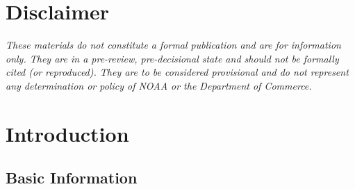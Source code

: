 \documentclass[11pt,
  english,
  a4paper,
]{article}
\begin{document}
\newcommand{\lt}{\ensuremath <}
\newcommand{\gt}{\ensuremath >}


\setcounter{page}{1}

\renewcommand{\thetable}{\roman{table}}
\renewcommand{\thefigure}{\roman{figure}}

\setlength\parskip{0.5em plus 0.1em minus 0.2em}

\vspace{500cm}


\hypertarget{disclaimer}{%
\section*{Disclaimer}\label{disclaimer}}

\leavevmode\tagmcend\tagstructend


\emph{These materials do not constitute a formal publication and are for information only. They are in a pre-review, pre-decisional state and should not be formally cited (or reproduced). They are to be considered provisional and do not represent any determination or policy of NOAA or the Department of Commerce.}

\leavevmode\tagmcend\tagstructend\par

\pagebreak

\pagebreak
{}
\setcounter{page}{1}
\renewcommand{\thefigure}{\arabic{figure}}
\renewcommand{\thetable}{\arabic{table}}
\setcounter{table}{0}
\setcounter{figure}{0}


\hypertarget{introduction}{%
\section{Introduction}\label{introduction}}

\leavevmode\tagmcend\tagstructend


\hypertarget{basic-information}{%
\subsection{Basic Information}\label{basic-information}}
\end{document}
